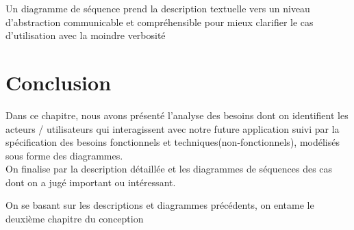 Un diagramme de séquence prend la description textuelle vers un niveau d'abstraction communicable et compréhensible pour mieux clarifier le cas d'utilisation avec la moindre verbosité



\section{Conclusion}
Dans ce chapitre, nous avons présenté l’analyse des besoins dont on identifient les acteurs / utilisateurs qui interagissent avec notre future application suivi par la spécification des besoins fonctionnels et techniques(non-fonctionnels), modélisés sous forme des diagrammes.\\

On finalise par la description détaillée et les diagrammes de séquences des cas dont on a jugé important ou intéressant.

\vspace{0.01\textheight}
On se basant sur les descriptions et diagrammes précédents, on entame le deuxième chapitre du conception
